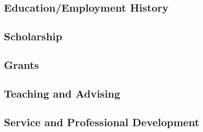 
\subsection*{Education/Employment History}


\subsection*{Scholarship}


\subsection*{Grants}


\subsection*{Teaching and Advising}


\subsection*{Service and Professional Development}

